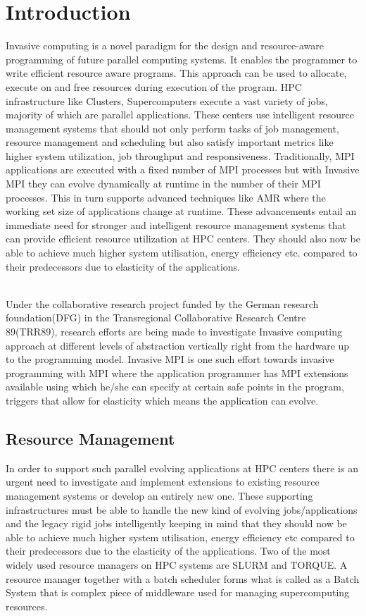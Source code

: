 \documentclass[a4paper, 12pt]{article}
\begin{document}
\newpage
\thispagestyle{empty}
\tableofcontents
\newpage
\listoffigures
\newpage

\setcounter{page}{1}
\section{Introduction}
Invasive computing is a novel paradigm for the design and resource-aware programming of future parallel computing systems. It enables the programmer to write efficient resource aware programs. This approach can be used to allocate, execute on and free resources during execution of the program. HPC infrastructure like Clusters, Supercomputers execute a vast variety of jobs, majority of which are parallel applications. These centers use intelligent resource management systems that should not only perform tasks of job management, resource management and scheduling but also satisfy important metrics like higher system utilization, job throughput and responsiveness. Traditionally, MPI applications are executed with a fixed number of MPI processes but with Invasive MPI they can evolve dynamically at runtime in the number of their MPI processes. This in turn supports advanced techniques like AMR where the working set size of applications change at runtime. These advancements entail an immediate need for stronger and intelligent resource management systems that can provide efficient resource utilization at HPC centers. They should also now be able to achieve much higher system utilisation, energy efficiency etc. compared to their predecessors due to elasticity of the applications.\par
\noindent
\\Under the collaborative research project funded by the German research foundation(DFG) in the Transregional Collaborative Research Centre 89(TRR89), research efforts are being made to investigate Invasive computing approach at different levels of abstraction vertically right from the hardware up to the programming model. Invasive MPI is one such effort towards invasive programming with MPI where the application programmer has MPI extensions available using which he/she can specify at certain safe points in the program, triggers that allow for elasticity which means the application can evolve.

\subsection{Resource Management}
In order to support such parallel evolving applications at HPC centers there is an urgent need to investigate and implement extensions to existing resource management systems or develop an entirely new one. These supporting infrastructures must be able to handle the new kind of evolving jobs/applications and the legacy rigid jobs intelligently keeping in mind that they should now be able to achieve much higher system utilisation, energy efficiency etc compared to their predecessors due to the elasticity of the applications. Two of the most widely used resource managers on HPC systems are SLURM and TORQUE. A resource manager together with a batch scheduler forms what is called as a Batch System that is complex piece of middleware used for managing supercomputing resources. 
\end{document}
